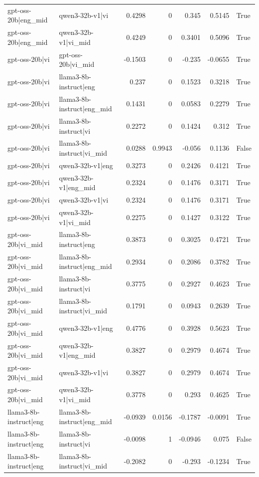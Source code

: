 \begin{table}
\begin{tabular}{l l r r r r l}
gpt-oss-20b|eng_mid & qwen3-32b-v1|vi & 0.4298 & 0 & 0.345 & 0.5145 & True \\
gpt-oss-20b|eng_mid & qwen3-32b-v1|vi_mid & 0.4249 & 0 & 0.3401 & 0.5096 & True \\
gpt-oss-20b|vi & gpt-oss-20b|vi_mid & -0.1503 & 0 & -0.235 & -0.0655 & True \\
gpt-oss-20b|vi & llama3-8b-instruct|eng & 0.237 & 0 & 0.1523 & 0.3218 & True \\
gpt-oss-20b|vi & llama3-8b-instruct|eng_mid & 0.1431 & 0 & 0.0583 & 0.2279 & True \\
gpt-oss-20b|vi & llama3-8b-instruct|vi & 0.2272 & 0 & 0.1424 & 0.312 & True \\
gpt-oss-20b|vi & llama3-8b-instruct|vi_mid & 0.0288 & 0.9943 & -0.056 & 0.1136 & False \\
gpt-oss-20b|vi & qwen3-32b-v1|eng & 0.3273 & 0 & 0.2426 & 0.4121 & True \\
gpt-oss-20b|vi & qwen3-32b-v1|eng_mid & 0.2324 & 0 & 0.1476 & 0.3171 & True \\
gpt-oss-20b|vi & qwen3-32b-v1|vi & 0.2324 & 0 & 0.1476 & 0.3171 & True \\
gpt-oss-20b|vi & qwen3-32b-v1|vi_mid & 0.2275 & 0 & 0.1427 & 0.3122 & True \\
gpt-oss-20b|vi_mid & llama3-8b-instruct|eng & 0.3873 & 0 & 0.3025 & 0.4721 & True \\
gpt-oss-20b|vi_mid & llama3-8b-instruct|eng_mid & 0.2934 & 0 & 0.2086 & 0.3782 & True \\
gpt-oss-20b|vi_mid & llama3-8b-instruct|vi & 0.3775 & 0 & 0.2927 & 0.4623 & True \\
gpt-oss-20b|vi_mid & llama3-8b-instruct|vi_mid & 0.1791 & 0 & 0.0943 & 0.2639 & True \\
gpt-oss-20b|vi_mid & qwen3-32b-v1|eng & 0.4776 & 0 & 0.3928 & 0.5623 & True \\
gpt-oss-20b|vi_mid & qwen3-32b-v1|eng_mid & 0.3827 & 0 & 0.2979 & 0.4674 & True \\
gpt-oss-20b|vi_mid & qwen3-32b-v1|vi & 0.3827 & 0 & 0.2979 & 0.4674 & True \\
gpt-oss-20b|vi_mid & qwen3-32b-v1|vi_mid & 0.3778 & 0 & 0.293 & 0.4625 & True \\
llama3-8b-instruct|eng & llama3-8b-instruct|eng_mid & -0.0939 & 0.0156 & -0.1787 & -0.0091 & True \\
llama3-8b-instruct|eng & llama3-8b-instruct|vi & -0.0098 & 1 & -0.0946 & 0.075 & False \\
llama3-8b-instruct|eng & llama3-8b-instruct|vi_mid & -0.2082 & 0 & -0.293 & -0.1234 & True \\

\end{tabular}
\end{table}
